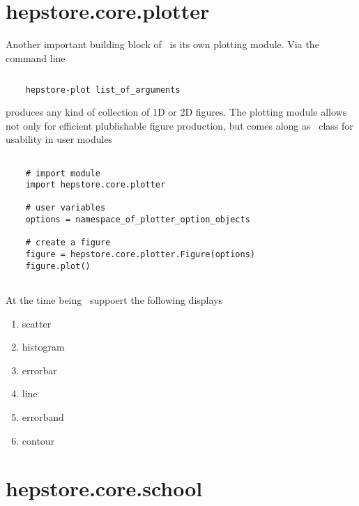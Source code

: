 \section{hepstore.core.plotter}

Another important building block of \hepstore~is its own plotting
module. Via the command line
%
\begin{changemargin}{1.5cm}{1.5cm}
  \centering
  \begin{lstlisting}[language=Bash]
    
    hepstore-plot list_of_arguments
  \end{lstlisting}
\end{changemargin}
%
produces any kind of collection of 1D or 2D figures. The plotting
module allows not only for efficient plublishable figure production,
but comes along as \python~class for usability in user modules
%
\begin{changemargin}{1.5cm}{1.5cm}
  \centering
  \begin{lstlisting}
    
    # import module
    import hepstore.core.plotter

    # user variables
    options = namespace_of_plotter_option_objects

    # create a figure
    figure = hepstore.core.plotter.Figure(options)
    figure.plot()
    
  \end{lstlisting}
\end{changemargin}
%
At the time being \hepstore~suppoert the following displays
%
\begin{enumerate}
\item scatter
\item histogram
\item errorbar
\item line
\item errorband
\item contour
\end{enumerate}
%


\section{hepstore.core.school}

